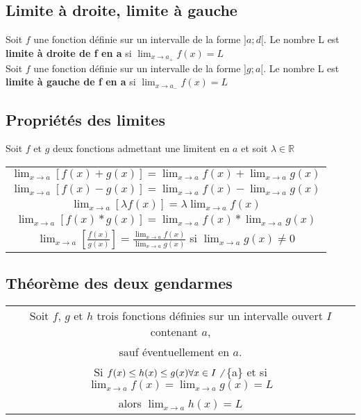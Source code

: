 \documentclass[12pt, a4paper]{book}
\begin{document}
\subsection{Limite à droite, limite à gauche}
Soit $f$ une fonction définie sur un intervalle de la forme $]a;d[$. Le nombre L est \textbf{limite à droite de f en a} si  $\lim_{x \to a_+} f(x) = L$\\
Soit $f$ une fonction définie sur un intervalle de la forme $]g;a[$. Le nombre L est \textbf{limite à gauche de f en a} si  $\lim_{x \to a_-} f(x) = L$\\
\subsection{Propriétés des limites}
Soit $f$ et $g$ deux fonctions admettant une limitent en $a$ et soit $\lambda \in \mathbb{R}$
\begin{center}
    \begin{tabular}{ |c|}
        \hline
        $\lim_{x \to a} [f(x)+g(x)] =\lim_{x \to a}f(x) + \lim_{x \to a}g(x) $\\
        $\lim_{x \to a} [f(x)-g(x)] =\lim_{x \to a}f(x) - \lim_{x \to a}g(x) $\\
        $\lim_{x \to a} [\lambda f(x)] =\lambda \lim_{x \to a}f(x)$\\
        $\lim_{x \to a} [f(x)*g(x)] =\lim_{x \to a}f(x) * \lim_{x \to a}g(x) $\\
        $\lim_{x \to a} [\frac{f(x)}{g(x)}] =\frac{\lim_{x \to a}f(x)}{\lim_{x \to a}g(x)}$ si $\lim_{x \to a}g(x) \not = 0$\\
        \hline
    \end{tabular}
\end{center}
\newpage
\subsection{Théorème des deux gendarmes}
\begin{center}
    \begin{tabular}{ |c|}
        \hline
        Soit $f$, $g$ et $h$ trois fonctions définies sur un intervalle ouvert $I$ contenant $a$,\\
        sauf éventuellement en $a$.\\
        Si $f(x) \leq h(x) \leq g(x) \forall x \in I \not \;$ \{a\} et si
        $\lim_{x \to a}f(x) =\lim_{x \to a}g(x) = L$\\
         alors $\lim_{x \to a}h(x) = L$\\
        \hline
    \end{tabular}
\end{center}
\end{document}
